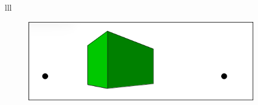 \vskip 1cm
lll
\begin{figure}[H]
   \centering
   \includegraphics[width=10.0cm,trim=4 4 8 4,clip]{./images/ripetere/ripetere-14.png}
   \label{rip-15}
\end{figure}



